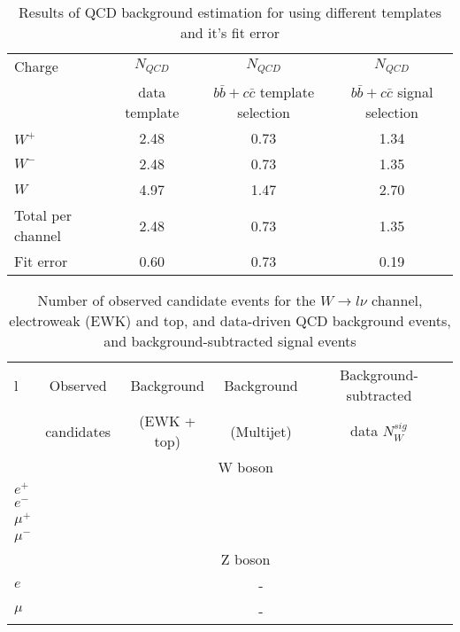\begin{table}[!tbp]
    \caption{Results of QCD background estimation for \wmunu using different templates and it's fit error}
	\label{tab:QCDWmunu}
	\begin{center}
		\begin{tabular}{l | c | c | c  }
		\hline
		    Charge & $N_{QCD}$ & $N_{QCD}$ & $N_{QCD}$ \\
		    & data template & $b\bar{b}+c\bar{c}$ template selection & $b\bar{b}+c\bar{c}$ signal selection \\
		    \hline
		    $W^{+}$ & 2.48 & 0.73 & 1.34 \\
		    $W^{-} $ & 2.48 & 0.73 & 1.35 \\
		    $W$ & 4.97 & 1.47 & 2.70  \\
		    \hline
		    \hline
		    Total per channel & 2.48 & 0.73 & 1.35 \\
		    Fit error & 0.60 & 0.73 & 0.19 \\
		    \hline
		\end{tabular}
	\end{center}
\end{table}

\begin{table}[!b]
    \caption{Number of observed candidate events for the $W \to l\nu$ channel, electroweak (EWK) and top, and data-driven QCD background events, and background-subtracted signal events}
	\label{tab:BkgWlnu}
	\begin{center}
		\begin{tabular}{l || c || c | c || c  }
		\hline
		l & Observed & Background & Background & Background-subtracted \\
		 & candidates & (EWK + top) & (Multijet) & data $N_{W}^{sig}$ \\
		 \hline
		 \hline
		 & \multicolumn{4}{c}{W boson}\\
		 \hline
		 $e^{+}$ & \ntotWplusenu & \nEWttbarbkgWplusenu & \nQCDWplusenu & \ntotsignalWplusenu \\
		 $e^{-}$ & \ntotWminenu & \nEWttbarbkgWminenu & \nQCDWminenu & \ntotsignalWminenu \\
		 $\mu^{+}$ & \ntotWplusmunu & \nEWttbarbkgWplusmunu & \nQCDWplusmunu & \ntotsignalWplusmunu \\
		 $\mu^{-}$ & \ntotWminmunu &\nEWttbarbkgWminmunu & \nQCDWminmunu & \ntotsignalWminmunu \\
		 \hline
		 \hline
		 & \multicolumn{4}{c}{Z boson}\\
		 \hline
		 $e$ & \ntotZee & \nEWttbarbkgZee  & - &\ntotsignalZee \\
		 $\mu$ & \ntotZmumu &\nEWttbarbkgZmumu  & - & \ntotsignalZmumu \\
		 \hline
		 \end{tabular}
   \end{center}
\end{table}

